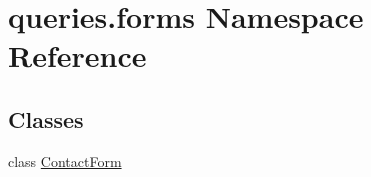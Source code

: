 \hypertarget{namespacequeries_1_1forms}{\section{queries.\-forms Namespace Reference}
\label{namespacequeries_1_1forms}
}
\subsection*{Classes}
\begin{DoxyCompactItemize}
\item 
class \hyperlink{classqueries_1_1forms_1_1_contact_form}{Contact\-Form}
\end{DoxyCompactItemize}
